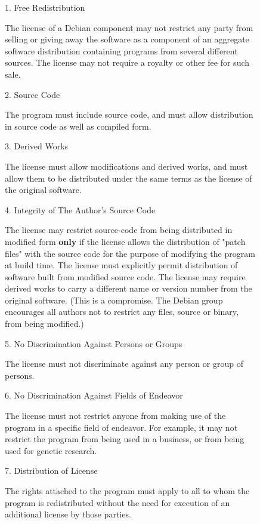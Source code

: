 \documentclass[mingoth,a4paper]{jsarticle}
\begin{document}
\begin{figure}[h]
 \begin{multicols}{2}
 {\small
     1. Free Redistribution

       The license of a Debian component may not restrict any party from
       selling or giving away the software as a component of an aggregate
       software distribution containing programs from several different
       sources. The license may not require a royalty or other fee for
       such sale.

    2. Source Code

       The program must include source code, and must allow distribution
       in source code as well as compiled form.

    3. Derived Works

       The license must allow modifications and derived works, and must
       allow them to be distributed under the same terms as the license
       of the original software.

    4. Integrity of The Author's Source Code

       The license may restrict source-code from being distributed in
       modified form {\bf only} if the license allows the distribution of
       "patch files" with the source code for the purpose of modifying
       the program at build time. The license must explicitly permit
       distribution of software built from modified source code. The
       license may require derived works to carry a different name or
       version number from the original software. (This is a compromise.
       The Debian group encourages all authors not to restrict any files,
       source or binary, from being modified.)

    5. No Discrimination Against Persons or Groups

       The license must not discriminate against any person or group of
       persons.

    6. No Discrimination Against Fields of Endeavor

       The license must not restrict anyone from making use of the
       program in a specific field of endeavor. For example, it may not
       restrict the program from being used in a business, or from being
       used for genetic research.

    7. Distribution of License

       The rights attached to the program must apply to all to whom the
       program is redistributed without the need for execution of an
       additional license by those parties.

}
\end{multicols}
\end{figure}
\end{document}
